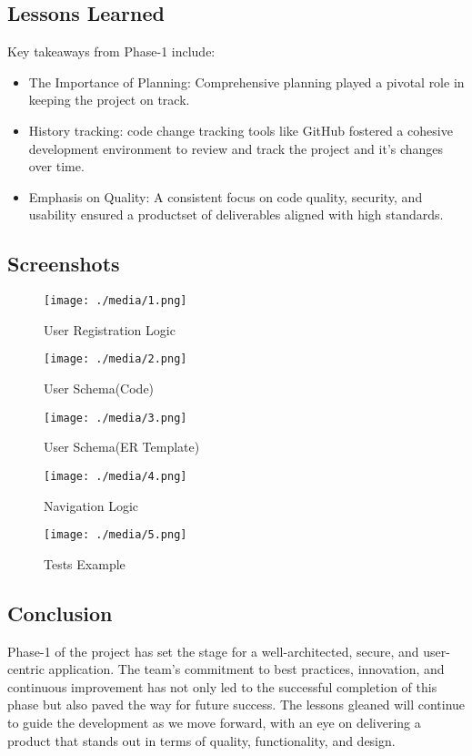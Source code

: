 \documentclass[11pt]{article}
\begin{document}
\subsection{Lessons Learned}
\label{sec:orgb2ea871}
Key takeaways from Phase-1 include:

\begin{itemize}
\item The Importance of Planning: Comprehensive planning played a pivotal role
in keeping the project on track.

\item History tracking: code change tracking tools like GitHub fostered a
cohesive development environment to review and track the project and it's
changes over time.

\item Emphasis on Quality: A consistent focus on code quality, security, and
usability ensured a productset of deliverables aligned with high
standards.
\end{itemize}


\subsection{Screenshots}
\label{sec:org11c6431}

\begin{figure}[htbp]
\centering
\texttt{[image: ./media/1.png]}
\caption{User Registration Logic}
\end{figure}

\begin{figure}[htbp]
\centering
\texttt{[image: ./media/2.png]}
\caption{User Schema(Code)}
\end{figure}

\begin{figure}[htbp]
\centering
\texttt{[image: ./media/3.png]}
\caption{User Schema(ER Template)}
\end{figure}

\begin{figure}[htbp]
\centering
\texttt{[image: ./media/4.png]}
\caption{Navigation Logic}
\end{figure}

\begin{figure}[htbp]
\centering
\texttt{[image: ./media/5.png]}
\caption{Tests Example}
\end{figure}

\subsection{Conclusion}
\label{sec:org88d605a}

Phase-1 of the project has set the stage for a well-architected, secure, and
user-centric application. The team's commitment to best practices, innovation,
and continuous improvement has not only led to the successful completion of this
phase but also paved the way for future success. The lessons gleaned will
continue to guide the development as we move forward, with an eye on delivering
a product that stands out in terms of quality, functionality, and design.
\end{document}
